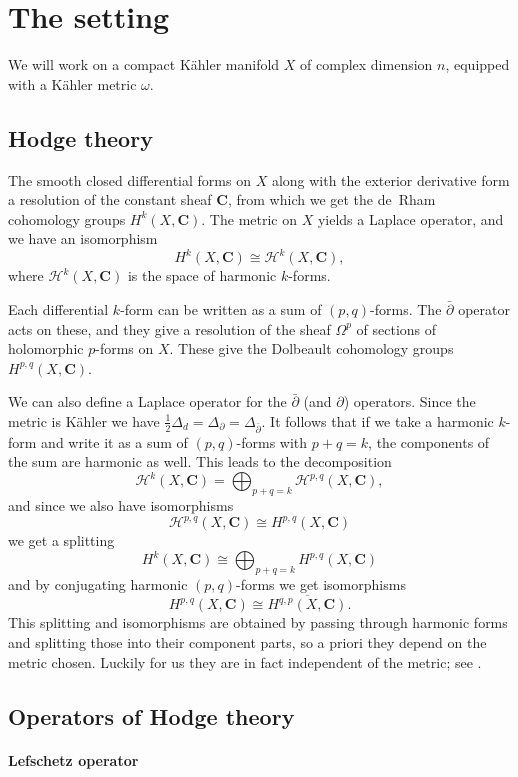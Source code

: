 \documentclass[11pt]{article}
\theoremstyle{definition}
\def\ov#1{\overline{#1}}
\def\CC{\mathbf{C}}
\def\HH{\mathcal{H}}
\begin{document}
\section{The setting}

We will work on a compact K\"ahler manifold $X$ of complex dimension $n$, equipped with a K\"ahler metric $\omega$.


\subsection{Hodge theory}

The smooth closed differential forms on $X$ along with the exterior derivative form a resolution of the constant sheaf $\CC$, from which we get the de~Rham cohomology groups $H^k(X, \CC)$.
The metric on $X$ yields a Laplace operator, and we have an isomorphism
\[
H^k(X, \CC) \cong \HH^k(X, \CC),
\]
where $\HH^k(X, \CC)$ is the space of harmonic $k$-forms.

Each differential $k$-form can be written as a sum of $(p,q)$-forms.
The $\bar\partial$ operator acts on these, and they give a resolution of the sheaf $\Omega^p$ of sections of holomorphic $p$-forms on $X$.
These give the Dolbeault cohomology groups $H^{p,q}(X, \CC)$.

We can also define a Laplace operator for the $\bar\partial$ (and $\partial$) operators.
Since the metric is K\"ahler we have $\frac12 \Delta_d = \Delta_\partial = \Delta_{\bar\partial}$.
It follows that if we take a harmonic $k$-form and write it as a sum of $(p,q)$-forms with $p+q = k$, the components of the sum are harmonic as well.
This leads to the decomposition
\[
\HH^k(X, \CC) = \bigoplus_{p+q=k} \HH^{p,q}(X, \CC),
\]
and since we also have isomorphisms
\[
\HH^{p,q}(X,\CC) \cong H^{p,q}(X,\CC)
\]
we get a splitting 
\[
H^k(X, \CC) \cong \bigoplus_{p+q=k} H^{p,q}(X, \CC)
\]
and by conjugating harmonic $(p,q)$-forms we get isomorphisms
\[
H^{p,q}(X,\CC) \cong \ov{H^{q,p}(X,\CC)}.
\]
This splitting and isomorphisms are obtained by passing through harmonic forms and splitting those into their component parts, so a priori they depend on the metric chosen.
Luckily for us they are in fact independent of the metric; see \cite[Corollary~VI.8.7]{demailly-complex}.


\subsection{Operators of Hodge theory}


\paragraph{Lefschetz operator}
\end{document}
